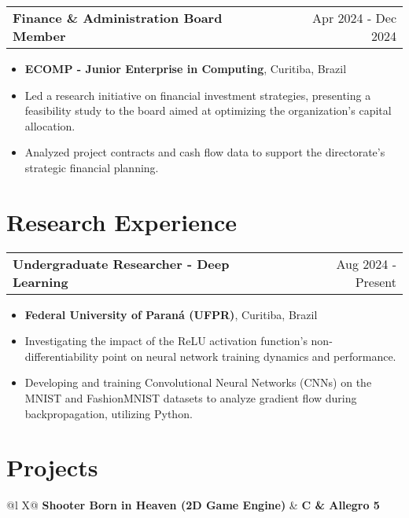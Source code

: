 \documentclass[a4paper,12pt]{article}
\makeatletter
\newenvironment{joblong}[2]
    {
    \begin{tabularx}{\linewidth}{@{}l X r@{}}
    \textbf{#1} & \hfill &  #2 \\[3.75pt]
    \end{tabularx}
    \begin{minipage}[t]{\linewidth}
    \begin{itemize}[nosep,after=\strut, leftmargin=1em, itemsep=3pt,label=--]
    }
    {
    \end{itemize}
    \end{minipage}    
    }
\makeatother
\begin{document}
\begin{joblong}{Finance \& Administration Board Member}{Apr 2024 - Dec 2024}
\item \textbf{ECOMP - Junior Enterprise in Computing}, Curitiba, Brazil
\item Led a research initiative on financial investment strategies, presenting a feasibility study to the board aimed at optimizing the organization's capital allocation.
\item Analyzed project contracts and cash flow data to support the directorate's strategic financial planning.
\end{joblong}

\section{Research Experience}

\begin{joblong}{Undergraduate Researcher - Deep Learning}{Aug 2024 - Present}
\item \textbf{Federal University of Paraná (UFPR)}, Curitiba, Brazil
\item Investigating the impact of the ReLU activation function's non-differentiability point on neural network training dynamics and performance.
\item Developing and training Convolutional Neural Networks (CNNs) on the MNIST and FashionMNIST datasets to analyze gradient flow during backpropagation, utilizing Python.
\end{joblong}

\section{Projects}

\begin{tabularx}{\linewidth}{@{}l X@{}}
\textbf{Shooter Born in Heaven (2D Game Engine)} & \hfill \textbf{C \& Allegro 5} \\
 \\
\end{tabularx}
\end{document}
